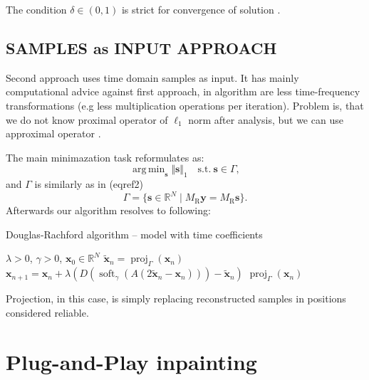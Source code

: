 \documentclass[conference]{IEEEtran}
\begin{document}
The condition   $ \delta  \in (0,1)$ is strict for convergence of solution \cite{Combettes2010}.


\subsection{SAMPLES as INPUT APPROACH}\label{subsec:timecoef}

Second approach uses time domain samples as input.
It has mainly computational advice against first approach, in algorithm are less time-frequency transformations (e.g less multiplication operations per iteration).
Problem is, 
that we do not know proximal operator of $ \ell_1 $ norm after analysis, but we can use approximal operator \cite{Mokry2021}.

The main minimazation task reformulates as:
\begin{equation*}
	\mathop {\operatorname{arg \, min}}_\mathbf {s}\Vert \mathbf {s}\Vert _1 \quad \text{s.t.}\ \mathbf {s}\in \Gamma, \tag{3}
\end{equation*} 
and $ \Gamma $ is similarly as in  (eqref2) %
\begin{equation*}
	\Gamma = \lbrace \mathbf {s}\in \mathbb {R}^N\mid M_{\mathrm{R}}\mathbf {y}=M_{\mathrm{R}}\mathbf {s}\rbrace. \tag{4} 
\end{equation*}
Afterwards our algorithm resolves to following: 
\begin{algorithm}
	\caption{Douglas-Rachford algorithm -- model with time coefficients}
	\begin{algorithmic}[1]
		\renewcommand{\algorithmicrequire}{\textbf{Input:}}
		\renewcommand{\algorithmicensure}{\textbf{Output:}}
		\REQUIRE $ \lambda > 0 $, $ \gamma>0 $, $ \mathbf{x}_0 \in \mathbb{R}^{N} $
		\STATE $\mathbf{\widetilde{x}}_n=\operatorname{proj}_{\Gamma}(\mathbf{x}_n) $ 
		\STATE $ \mathbf{x}_{n+1} = \mathbf{x}_n + \lambda \left( D\left(\operatorname{soft}_{\gamma}\left(A\left(2\mathbf{\widetilde{x}}_n-\mathbf{x}_n\right) \right)\right) -\mathbf{\widetilde{x}}_n\right)$
		\ENDFOR
		\RETURN $\operatorname{proj}_{\Gamma}(\mathbf{x}_n)$ 
	\end{algorithmic} 
\end{algorithm}

Projection, in this case, is simply replacing reconstructed samples in positions considered reliable.

\section{Plug-and-Play inpainting} \label{sec:plugaandplay}
\end{document}
